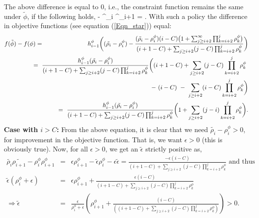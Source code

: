 %
The above difference is equal to 0, i.e., the constraint function remains the same under  $\tilde{\phi}$,  if the following holds,
\beq
{} - \rho^\phi_i \rho^\phi_{i+1} =   .
\eeq
%
With such a policy the difference in objective functions (see equation (\ref{Eqn_star})) equal: 
\begin{eqnarray*}
	f(\tilde{\phi}) - f(\phi)   
	&=& \h_{i - 1}^\phi \bigg( (\tilde{\rho_i} - \rho^\phi_i) - \frac{(\tilde{\rho_i} - \rho^\phi_i)(i - C)\big(1 + \sum_{j \geq i+2}^{\infty} \prod_{k = i+2}^j  \rho^\phi_k \big)}{(i+1-C) + \sum_{j \geq i+2} (j - C) \prod_{k = i+2}^{j} \rho^\phi_k}  \bigg) \\ 
	&& \hspace{-10mm} = \
	\frac{\h_{i - 1}^\phi (\tilde{\rho_i} - \rho^\phi_i)}{(i+1-C) + \sum_{j \geq i+2} (j - C) \prod_{k = i+2}^{j} \rho^\phi_k}\bigg( (i+1-C) + \sum_{j \geq i+2} (j - C) \prod_{k = i+2}^{j} \rho^\phi_k \  \\
	&& \hspace{60mm} - \  (i - C) \  - \ \sum_{j \geq i+2} (i - C) \prod_{k = i+2}^{j} \rho^\phi_k   \bigg)\\
	&& \hspace{-10mm} = \ \frac{\h_{i - 1}^\phi (\tilde{\rho_i} - \rho^\phi_i)}{(i+1-C) + \sum_{j \geq i+2} (j - C) \prod_{k = i+2}^{j} \rho^\phi_k} \bigg( 1 + \sum_{j \geq i+2} (j - i) \prod_{k = i+2}^{j} \rho^\phi_k  \bigg ).
\end{eqnarray*}
%
{\bf Case with $i > C$:}  From the above equation, it is clear that we need $\tilde{\rho_i} - \rho^\phi_i > 0$,   for improvement in the objective function. That is, we want $\epsilon > 0$ (this is obviously true). 
Now, for  all $\epsilon > 0$, we get an $\tilde{\epsilon} $ strictly positive as, 
\begin{eqnarray}
\tilde{\rho_i}\tilde{\rho_{i+1}} - \rho^\phi_i \rho^\phi_{i+1} &=& \epsilon\rho^\phi_{i+1} - \tilde{\epsilon}\rho^\phi_i - \epsilon \tilde{\epsilon} =  \frac{-\epsilon(i - C)}{(i+1-C) + \sum_{j \geq i+2} (j - C) \prod_{k = i+2}^{j} \rho^\phi_k} \mbox{ and thus}  \nonumber  \\
%
\tilde{\epsilon}(\rho^\phi_i + \epsilon) &=& \epsilon\rho^\phi_{i+1}  + \frac{\epsilon(i - C)}{(i+1-C) + \sum_{j \geq i+2} (j - C) \prod_{k = i+2}^{j} \rho^\phi_k} \nonumber \\
\Rightarrow \tilde{\epsilon}  &=& \frac{\epsilon }{\rho^\phi_i + \epsilon}  \left ( \rho^\phi_{i+1 } + \frac{ (i - C)}{  \left((i+1-C) + \sum_{j \geq i+2} (j - C) \prod_{k = i+2}^{j} \rho^\phi_k \right)} \right ) > 0. 
\label{Eqn_Condition2}
\end{eqnarray}
